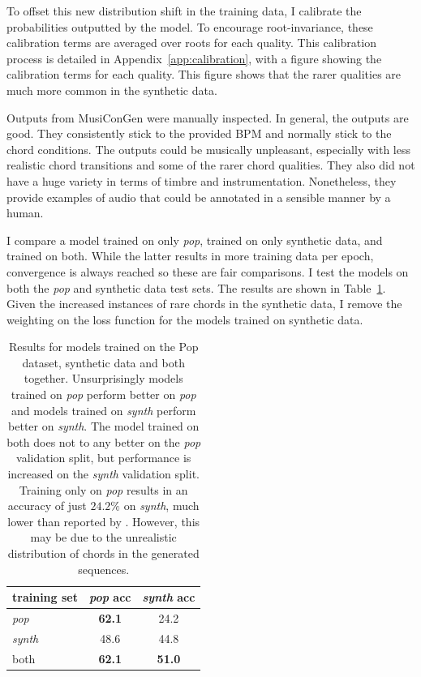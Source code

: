To offset this new distribution shift in the training data, I calibrate the probabilities outputted by the model. To encourage root-invariance, these calibration terms are averaged over roots for each quality. This calibration process is detailed in Appendix~\ref{app:calibration}, with a figure showing the calibration terms for each quality. This figure shows that the rarer qualities are much more common in the synthetic data.

Outputs from MusiConGen were manually inspected. In general, the outputs are good. They consistently stick to the provided BPM and normally stick to the chord conditions. The outputs could be musically unpleasant, especially with less realistic chord transitions and some of the rarer chord qualities. They also did not have a huge variety in terms of timbre and instrumentation. Nonetheless, they provide examples of audio that could be annotated in a sensible manner by a human.

I compare a model trained on only \emph{pop}, trained on only synthetic data, and trained on both. While the latter results in more training data per epoch, convergence is always reached so these are fair comparisons. I test the models on both the \emph{pop} and synthetic data test sets. The results are shown in Table~\ref{tab:synthetic_data}. Given the increased instances of rare chords in the synthetic data, I remove the weighting on the loss function for the models trained on synthetic data.

\begin{table}[h]
    \centering
    \begin{tabular}{lcc}
        \toprule
        training set & \emph{pop} acc & \emph{synth} acc \\  
        \midrule
        \emph{pop} & \textbf{62.1} & 24.2 \\
        \emph{synth} & 48.6 & 44.8 \\
        both & \textbf{62.1} & \textbf{51.0} \\
        \bottomrule
    \end{tabular}
    \caption{Results for models trained on the Pop dataset, synthetic data and both together. Unsurprisingly models trained on \emph{pop} perform better on \emph{pop} and models trained on \emph{synth} perform better on \emph{synth}. The model trained on both does not to any better on the \emph{pop} validation split, but performance is increased on the \emph{synth} validation split. Training only on \emph{pop} results in an accuracy of just $24.2\%$ on \emph{synth}, much lower than reported by \citet{MusiConGen}. However, this may be due to the unrealistic distribution of chords in the generated sequences. }\label{tab:synthetic_data}
\end{table}

